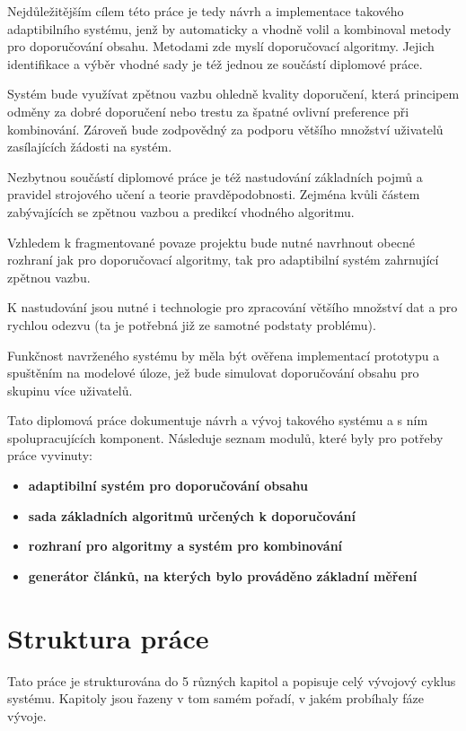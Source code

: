 \documentclass[thesis=M,czech]{FITthesis}[2014/05/07]
\begin{document}
\begin{introduction}
	Nejdůležitějším cílem této práce je tedy návrh a implementace takového adaptibilního systému, jenž by automaticky a vhodně volil a kombinoval metody pro doporučování obsahu. Metodami zde myslí doporučovací algoritmy. Jejich identifikace a výběr vhodné sady je též jednou ze součástí diplomové práce.
	
	Systém bude využívat zpětnou vazbu ohledně kvality doporučení, která principem odměny za dobré doporučení nebo trestu za špatné ovlivní preference při kombinování. Zároveň bude zodpovědný za podporu většího množství uživatelů zasílajících žádosti na systém.
	
	Nezbytnou součástí diplomové práce je též nastudování základních pojmů a pravidel strojového učení a teorie pravděpodobnosti. Zejména kvůli částem zabývajících se zpětnou vazbou a predikcí vhodného algoritmu. 
	
	Vzhledem k fragmentované povaze projektu bude nutné navrhnout obecné rozhraní jak pro doporučovací algoritmy, tak pro adaptibilní systém zahrnující zpětnou vazbu.
	
	K nastudování jsou nutné i technologie pro zpracování většího množství dat a pro rychlou odezvu (ta je potřebná již ze samotné podstaty problému).
	
	Funkčnost navrženého systému by měla být ověřena implementací prototypu a spuštěním na modelové úloze, jež bude simulovat doporučování obsahu pro skupinu více uživatelů.
	
	Tato diplomová práce dokumentuje návrh a vývoj takového systému a s ním spolupracujících komponent. Následuje seznam modulů, které byly pro potřeby práce vyvinuty:

\begin{itemize}
  \item \textbf{adaptibilní systém pro doporučování obsahu}
  \item \textbf{sada základních algoritmů určených k doporučování}
  \item \textbf{rozhraní pro algoritmy a systém pro kombinování}
  \item \textbf{generátor článků, na kterých bylo prováděno základní měření}
\end{itemize}	

\section{Struktura práce}
\label{sec:structure}
	Tato práce je strukturována do 5 různých kapitol a popisuje celý vývojový cyklus systému. Kapitoly jsou řazeny v tom samém pořadí, v jakém probíhaly fáze vývoje.	


\end{introduction}
\end{document}
